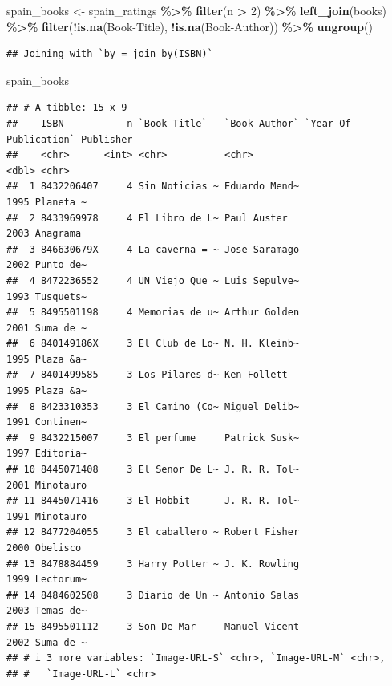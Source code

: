 \documentclass[
]{book}
\newenvironment{Shaded}{\begin{snugshade}}{\end{snugshade}}
\newcommand{\AttributeTok}[1]{\textcolor[rgb]{0.13,0.29,0.53}{#1}}
\newcommand{\DecValTok}[1]{\textcolor[rgb]{0.00,0.00,0.81}{#1}}
\newcommand{\FunctionTok}[1]{\textcolor[rgb]{0.13,0.29,0.53}{\textbf{#1}}}
\newcommand{\NormalTok}[1]{#1}
\newcommand{\OtherTok}[1]{\textcolor[rgb]{0.56,0.35,0.01}{#1}}
\newcommand{\SpecialCharTok}[1]{\textcolor[rgb]{0.81,0.36,0.00}{\textbf{#1}}}
\newcommand{\StringTok}[1]{\textcolor[rgb]{0.31,0.60,0.02}{#1}}
\theoremstyle{definition}
\theoremstyle{definition}
\theoremstyle{definition}
\theoremstyle{definition}
\theoremstyle{remark}
\begin{document}
\begin{Shaded}
\begin{Highlighting}[]
\NormalTok{spain\_books }\OtherTok{\textless{}{-}}\NormalTok{ spain\_ratings }\SpecialCharTok{\%\textgreater{}\%} 
  \FunctionTok{filter}\NormalTok{(n }\SpecialCharTok{\textgreater{}} \DecValTok{2}\NormalTok{) }\SpecialCharTok{\%\textgreater{}\%} 
  \FunctionTok{left\_join}\NormalTok{(books) }\SpecialCharTok{\%\textgreater{}\%} 
  \FunctionTok{filter}\NormalTok{(}\SpecialCharTok{!}\FunctionTok{is.na}\NormalTok{(}\StringTok{\textasciigrave{}}\AttributeTok{Book{-}Title}\StringTok{\textasciigrave{}}\NormalTok{), }\SpecialCharTok{!}\FunctionTok{is.na}\NormalTok{(}\StringTok{\textasciigrave{}}\AttributeTok{Book{-}Author}\StringTok{\textasciigrave{}}\NormalTok{)) }\SpecialCharTok{\%\textgreater{}\%} 
  \FunctionTok{ungroup}\NormalTok{()}
\end{Highlighting}
\end{Shaded}

\begin{verbatim}
## Joining with `by = join_by(ISBN)`
\end{verbatim}

\begin{Shaded}
\begin{Highlighting}[]
\NormalTok{spain\_books}
\end{Highlighting}
\end{Shaded}

\begin{verbatim}
## # A tibble: 15 x 9
##    ISBN           n `Book-Title`   `Book-Author` `Year-Of-Publication` Publisher
##    <chr>      <int> <chr>          <chr>                         <dbl> <chr>    
##  1 8432206407     4 Sin Noticias ~ Eduardo Mend~                  1995 Planeta ~
##  2 8433969978     4 El Libro de L~ Paul Auster                    2003 Anagrama 
##  3 846630679X     4 La caverna = ~ Jose Saramago                  2002 Punto de~
##  4 8472236552     4 UN Viejo Que ~ Luis Sepulve~                  1993 Tusquets~
##  5 8495501198     4 Memorias de u~ Arthur Golden                  2001 Suma de ~
##  6 840149186X     3 El Club de Lo~ N. H. Kleinb~                  1995 Plaza &a~
##  7 8401499585     3 Los Pilares d~ Ken Follett                    1995 Plaza &a~
##  8 8423310353     3 El Camino (Co~ Miguel Delib~                  1991 Continen~
##  9 8432215007     3 El perfume     Patrick Susk~                  1997 Editoria~
## 10 8445071408     3 El Senor De L~ J. R. R. Tol~                  2001 Minotauro
## 11 8445071416     3 El Hobbit      J. R. R. Tol~                  1991 Minotauro
## 12 8477204055     3 El caballero ~ Robert Fisher                  2000 Obelisco 
## 13 8478884459     3 Harry Potter ~ J. K. Rowling                  1999 Lectorum~
## 14 8484602508     3 Diario de Un ~ Antonio Salas                  2003 Temas de~
## 15 8495501112     3 Son De Mar     Manuel Vicent                  2002 Suma de ~
## # i 3 more variables: `Image-URL-S` <chr>, `Image-URL-M` <chr>,
## #   `Image-URL-L` <chr>
\end{verbatim}
\end{document}
